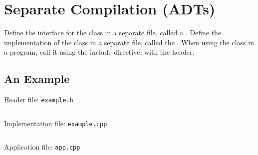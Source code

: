 \documentclass[\main/notes.tex]{subfiles}
\begin{document}
	\setcounter{chapter}{6}
	\chapter{Separate Compilation (ADTs)}
		Define the interface for the class in a separate file, called a . Define the implementation of the class in a separate file, called the . When using the class in a program, call it using the include directive, with the header.
		\section{An Example}
			\begin{codebox}{Header file: \texttt{example.h}}
				\inputminted{cpp}{\subfix{code/01_example/example.h}}
			\end{codebox}
			\pagebreak
			\begin{codebox}{Implementation file: \texttt{example.cpp}}
				\inputminted{cpp}{\subfix{code/01_example/example.cpp}}
			\end{codebox}
			\begin{codebox}{Application file: \texttt{app.cpp}}
				\inputminted{cpp}{\subfix{code/01_example/app.cpp}}
			\end{codebox}
\end{document}
